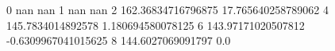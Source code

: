 0 nan nan
1 nan nan
2 162.36834716796875 17.765640258789062
4 145.7834014892578 1.180694580078125
6 143.97171020507812 -0.6309967041015625
8 144.6027069091797 0.0
